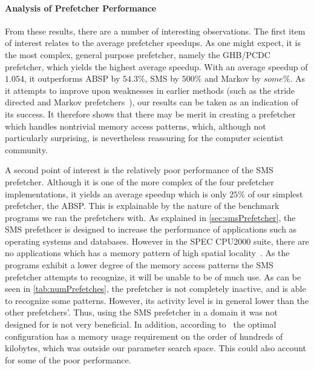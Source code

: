
\paragraph{Analysis of Prefetcher Performance}
\label{par:varprefperf}



From these results, there are a number of interesting observations. The first item of interest relates to the average
prefetcher speedups. As one might expect, it is the most complex,
general purpose prefetcher, namely the GHB/PCDC prefetcher, which
yields the highest average speedup. With an average speedup of
$1.054$, it outperforms ABSP by $54.3\%$, SMS by $500\%$ and Markov by
$some\%$. As it attempts to improve upon weaknesses in earlier methods
(such as the stride directed and Markov prefetchers~\cite{Nesbit}),
our results can be taken as an indication of its success. It therefore
shows that there may be merit in creating a prefetcher which handles
nontrivial memory access patterns, which, although not particularly
surprising, is nevertheless reassuring for the computer scientist
community.%

A second point of interest is the relatively poor performance of the
SMS prefetcher. Although it is one of the more complex of the four
prefetcher implementations, it yields an average speedup which is only
$25\%$ of our simplest prefetcher, the ABSP. This is explainable by
the nature of the benchmark programs we ran the prefetchers with. As
explained in \autoref{sec:smsPrefetcher}, the SMS prefethcer is
designed to increase the performance of applications such as operating
systems and databases. However in the SPEC CPU2000 suite, there are no applications which has a memory pattern of high spatial locality~\cite{SPECFAQ}. As the programs exhibit a lower degree
of the memory access patterns the SMS prefetcher attempts to
recognize, it will be unable to be of much use. As can be seen in
\autoref{tab:numPrefetches}, the prefetcher is not completely
inactive, and is able to recognize some patterns. However, its
activity level is in general lower than the other prefetchers'. Thus,
using the SMS prefetcher in a domain it was not designed for is not
very beneficial. In addition, according to~\cite{SMS} the optimal
configuration has a memory usage requirement on the order of hundreds
of kilobytes, which was outside our parameter search space. This could
also account for some of the poor performance.

